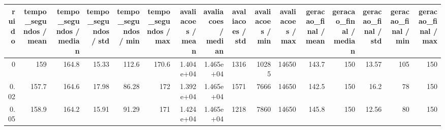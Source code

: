 \begin{tabular}{rrrrrrrrrrrrrrrr}
\toprule
ruido & tempo\_segundos / mean & tempo\_segundos / median & tempo\_segundos / std & tempo\_segundos / min & tempo\_segundos / max & avaliacoes / mean & avaliacoes / median & avaliacoes / std & avaliacoes / min & avaliacoes / max & geracao\_final / mean & geracao\_final / median & geracao\_final / std & geracao\_final / min & geracao\_final / max \\
\midrule
0 & 159 & 164.8 & 15.33 & 112.6 & 170.6 & 1.404e+04 & 1.465e+04 & 1316 & 10285 & 14650 & 143.7 & 150 & 13.57 & 105 & 150 \\
0.02 & 157.7 & 164.6 & 17.98 & 86.28 & 172 & 1.392e+04 & 1.465e+04 & 1571 & 7666 & 14650 & 142.5 & 150 & 16.2 & 78 & 150 \\
0.05 & 158.9 & 164.2 & 15.91 & 91.29 & 171 & 1.424e+04 & 1.465e+04 & 1218 & 7860 & 14650 & 145.8 & 150 & 12.56 & 80 & 150 \\
\bottomrule
\end{tabular}
